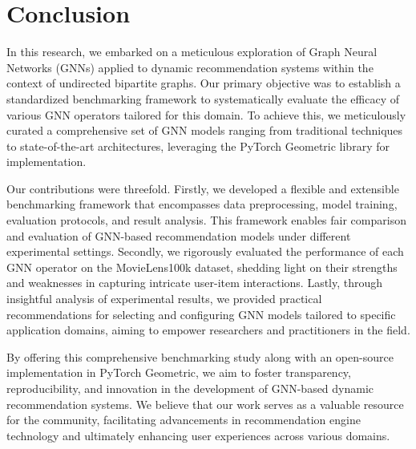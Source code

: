 \documentclass{scrartcl}
\begin{document}
\section{Conclusion}

\quad In this research, we embarked on a meticulous exploration of Graph Neural Networks (GNNs) applied to dynamic recommendation systems within the context of undirected bipartite graphs. Our primary objective was to establish a standardized benchmarking framework to systematically evaluate the efficacy of various GNN operators tailored for this domain. To achieve this, we meticulously curated a comprehensive set of GNN models ranging from traditional techniques to state-of-the-art architectures, leveraging the PyTorch Geometric library for implementation.

Our contributions were threefold. Firstly, we developed a flexible and extensible benchmarking framework that encompasses data preprocessing, model training, evaluation protocols, and result analysis. This framework enables fair comparison and evaluation of GNN-based recommendation models under different experimental settings. Secondly, we rigorously evaluated the performance of each GNN operator on the MovieLens100k dataset, shedding light on their strengths and weaknesses in capturing intricate user-item interactions. Lastly, through insightful analysis of experimental results, we provided practical recommendations for selecting and configuring GNN models tailored to specific application domains, aiming to empower researchers and practitioners in the field.

By offering this comprehensive benchmarking study along with an open-source implementation in PyTorch Geometric, we aim to foster transparency, reproducibility, and innovation in the development of GNN-based dynamic recommendation systems. We believe that our work serves as a valuable resource for the community, facilitating advancements in recommendation engine technology and ultimately enhancing user experiences across various domains.
\end{document}
